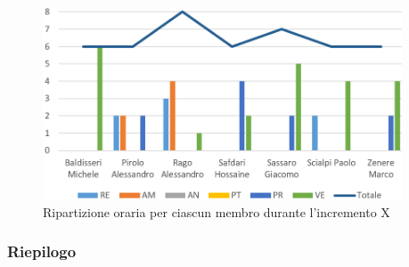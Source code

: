 \begin{figure}[!htb]   
    \centering
    \includegraphics[width=0.95\textwidth]{Images/prev10}
	\caption{Ripartizione oraria per ciascun membro durante l'incremento X}
\end{figure}

\subsubsection{Riepilogo}

